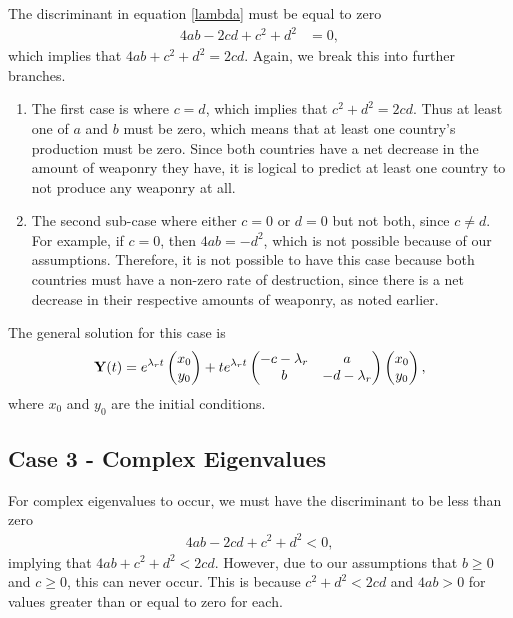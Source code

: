 The discriminant in equation \eqref{lambda} must be equal to zero
	\begin{align} \label{disEqualToZero}
	4ab -2cd + c^2 + d^2 & = 0,
	\end{align}
which implies that $4ab + c^2 + d^2 = 2cd$. 
Again, we break this into further branches.
	\begin{enumerate}
 		\item The first case is where $c = d$, which implies that $c^2 + d^2 = 2cd$. Thus at least one of $a$ and $b$ must be zero, which means that at least one country's production must be zero. Since both countries have a net decrease in the amount of weaponry they have, it is logical to predict at least one country to not produce any weaponry at all.
		\item The second sub-case where either $c = 0$ or $d = 0$ but not both, since $c \ne d$. For example, if $c = 0$, then $4ab = -d^2$, which is not possible because of our assumptions. Therefore, it is not possible to have this case because both countries must have a non-zero rate of destruction, since there is a net decrease in their respective amounts of weaponry, as noted earlier.
	\end{enumerate}
The general solution for this case is 
	\begin{align}
	\bold{Y}(t) = e^{\lambda_r t}
	\left( \begin{matrix}
	x_0 \\ y_0 
	\end{matrix}\right)
	+ te^{\lambda_r t}
	\left(\begin{matrix}
	-c - \lambda_r & a \\
	b & -d - \lambda_r 
	\end{matrix}\right)
	\left( \begin{matrix}
	x_0 \\ y_0 
	\end{matrix}\right),
	\end{align}
where $x_0$ and $y_0$ are the initial conditions.	
	
\subsection{Case 3 - Complex Eigenvalues}

For complex eigenvalues to occur, we must have the discriminant to be less than zero
	\begin{align} \label{disLessThanZero}
	4ab -2cd + c^2 + d^2 < 0,
	\end{align}
implying that $4ab + c^2 + d^2 < 2cd$. However, due to our assumptions that $b \ge 0$ and $c \ge 0$, this can never occur. This is because $c^2 + d^2 < 2cd$ and $4ab > 0$ for values greater than or equal to zero for each.

